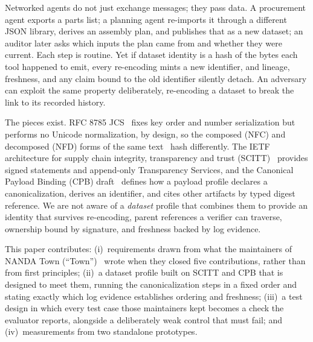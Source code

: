 \documentclass[conference]{IEEEtran}
\begin{document}
Networked agents do not just exchange messages; they pass data. A procurement agent exports a parts list; a planning agent re-imports it through a different JSON library, derives an assembly plan, and publishes that as a new dataset; an auditor later asks which inputs the plan came from and whether they were current. Each step is routine. Yet if dataset identity is a hash of the bytes each tool happened to emit, every re-encoding mints a new identifier, and lineage, freshness, and any claim bound to the old identifier silently detach. An adversary can exploit the same property deliberately, re-encoding a dataset to break the link to its recorded history.

The pieces exist. RFC 8785 JCS~\cite{rfc8785} fixes key order and number serialization but performs no Unicode normalization, by design, so the composed (NFC) and decomposed (NFD) forms of the same text~\cite{uax15} hash differently. The IETF architecture for supply chain integrity, transparency and trust (SCITT)~\cite{rfc9943} provides signed statements and append-only Transparency Services, and the Canonical Payload Binding (CPB) draft~\cite{cpb03} defines how a payload profile declares a canonicalization, derives an identifier, and cites other artifacts by typed digest reference. We are not aware of a \emph{dataset} profile that combines them to provide an identity that survives re-encoding, parent references a verifier can traverse, ownership bound by signature, and freshness backed by log evidence.

This paper contributes:
(i)~requirements drawn from what the maintainers of NANDA Town (``Town'')~\cite{town} wrote when they closed five contributions, rather than from first principles;
(ii)~a dataset profile built on SCITT and CPB that is designed to meet them, running the canonicalization steps in a fixed order and stating exactly which log evidence establishes ordering and freshness;
(iii)~a test design in which every test case those maintainers kept becomes a check the evaluator reports, alongside a deliberately weak control that must fail; and
(iv)~measurements from two standalone prototypes.
\end{document}
